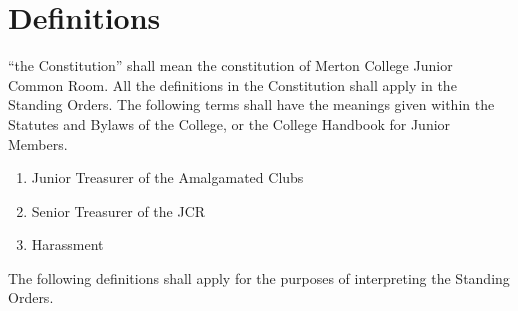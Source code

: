 \chapter{Definitions} \label{App:Defs}


\appnpara ``the Constitution'' shall mean the constitution of Merton College Junior Common Room.
\appnpara All the definitions in the Constitution shall apply in the Standing Orders.
\appnpara The following terms shall have the meanings given within the Statutes and Bylaws of the College, or the College Handbook for Junior Members.
\begin{enumerate}
\item Junior Treasurer of the Amalgamated Clubs
\item Senior Treasurer of the JCR
\item Harassment
\end{enumerate}

\appnpara The following definitions shall apply for the purposes of interpreting the Standing Orders.


